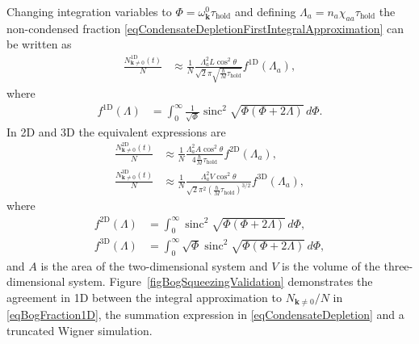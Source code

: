 \documentclass{iopart}
\DeclareMathOperator{\sinc}{sinc}
\begin{document}
Changing integration variables to $\Phi = \omega^{0}_{\mathbf{k}}\tau_\text{hold}$ and defining $\Lambda_a = n_a \chi_{aa} \tau_\text{hold}$ the non-condensed fraction \eqref{eqCondensateDepletionFirstIntegralApproximation} can be written as
\begin{align}
  \frac{N^\text{1D}_{\mathbf{k}\neq 0}(t)}{N} &\approx \frac{1}{N} \frac{\Lambda_a^2 L \cos^2\theta } {\sqrt{2}\pi\sqrt{\frac{\hbar}{M}\tau_\text{hold}}} f^\text{1D}(\Lambda_a), \label{eqBogFraction1D}
\end{align}
where
\begin{align}
  f^\text{1D}(\Lambda) &= \int_0^{\infty} \frac{1}{\sqrt{\Phi}}\sinc^2\sqrt{\Phi(\Phi + 2 \Lambda)}\, d\Phi.
\end{align}
In 2D and 3D the equivalent expressions are
\begin{align}
  \frac{N^{\text{2D}}_{\mathbf{k}\neq 0}(t)}{N} &\approx \frac{1}{N} \frac{\Lambda_a^2 A \cos^2\theta } {4\frac{\hbar}{M}\tau_\text{hold}} f^\text{2D}(\Lambda_a),  \label{eqBogFraction2D}\\
  \frac{N^{\text{3D}}_{\mathbf{k}\neq 0}(t)}{N} &\approx \frac{1}{N} \frac{\Lambda_a^2 V \cos^2\theta } {\sqrt{2}\pi^2\left(\frac{\hbar}{M}\tau_\text{hold}\right)^{3/2}} f^\text{3D}(\Lambda_a), \label{eqBogFraction3D}
\end{align}
where
\begin{align}
  f^\text{2D}(\Lambda) &= \int_0^{\infty} \sinc^2\sqrt{\Phi(\Phi + 2 \Lambda)}\, d\Phi,\\
  f^\text{3D}(\Lambda) &= \int_0^{\infty} \sqrt{\Phi} \sinc^2\sqrt{\Phi(\Phi + 2 \Lambda)}\, d\Phi,
\end{align}
and $A$ is the area of the two-dimensional system and $V$ is the volume of the three-dimensional system.  Figure~\ref{figBogSqueezingValidation} demonstrates the agreement in 1D between the integral approximation to $N_{\mathbf{k}\neq 0}/N$ in \eqref{eqBogFraction1D}, the summation expression in \eqref{eqCondensateDepletion} and a truncated Wigner simulation.
\end{document}
